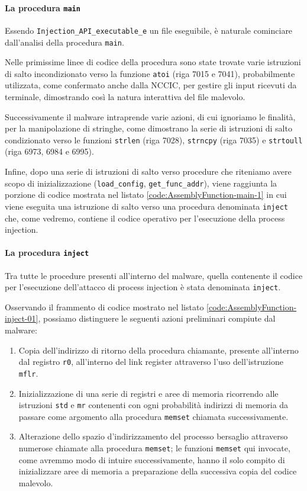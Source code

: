 \documentclass[10pt,a4paper, titlepage]{report}
\begin{document}
\paragraph{La procedura \texttt{main}} 

Essendo \texttt{Injection\_API\_executable\_e} un file eseguibile, è naturale cominciare dall'analisi della procedura \texttt{main}.

Nelle primissime linee di codice della procedura sono state trovate varie istruzioni di salto incondizionato verso la funzione \texttt{atoi} (riga 7015 e 7041), probabilmente utilizzata, come confermato anche dalla NCCIC, per gestire gli input ricevuti da terminale, dimostrando così la natura interattiva del file malevolo.  

Successivamente il malware intraprende varie azioni, di cui ignoriamo le finalità, per la manipolazione di stringhe, come dimostrano la serie di istruzioni di salto condizionato verso le funzioni \texttt{strlen} (riga 7028), \texttt{strncpy} (riga 7035) e \texttt{strtoull} (riga 6973, 6984 e 6995).

Infine, dopo una serie di istruzioni di salto verso procedure che riteniamo avere scopo di inizializzazione (\texttt{load\_config}, \texttt{get\_func\_addr}), viene raggiunta la porzione di codice mostrata nel listato \ref{code:AssemblyFunction-main-1} in cui viene eseguita una istruzione di salto verso una procedura denominata \texttt{inject} che, come vedremo, contiene il codice operativo per l'esecuzione della process injection. 

\paragraph{La procedura \texttt{inject}}

Tra tutte le procedure presenti all'interno del malware, quella contenente il codice per l'esecuzione dell'attacco di process injection è stata denominata     \texttt{inject}.

Osservando il frammento di codice mostrato nel listato \ref{code:AssemblyFunction-inject-01}, possiamo distinguere le seguenti azioni preliminari compiute dal malware:

\begin{enumerate}
\item Copia dell'indirizzo di ritorno della procedura chiamante, presente all'interno dal registro \texttt{r0}, all'interno del link register attraverso l'uso dell'istruzione \texttt{mflr}.
\item Inizializzazione di una serie di registri e aree di memoria ricorrendo alle istruzioni \texttt{std} e \texttt{mr} contenenti con ogni probabilità indirizzi di memoria da passare come argomento alla procedura \texttt{memset} chiamata successivamente.
\item Alterazione dello spazio d'indirizzamento del processo bersaglio attraverso numerose chiamate alla procedura \texttt{memset}; le funzioni \texttt{memset} qui invocate, come avremmo modo di intuire successivamente, hanno il solo compito di inizializzare aree di memoria a preparazione della successiva copia del codice malevolo.
 
\end{enumerate}
\end{document}
